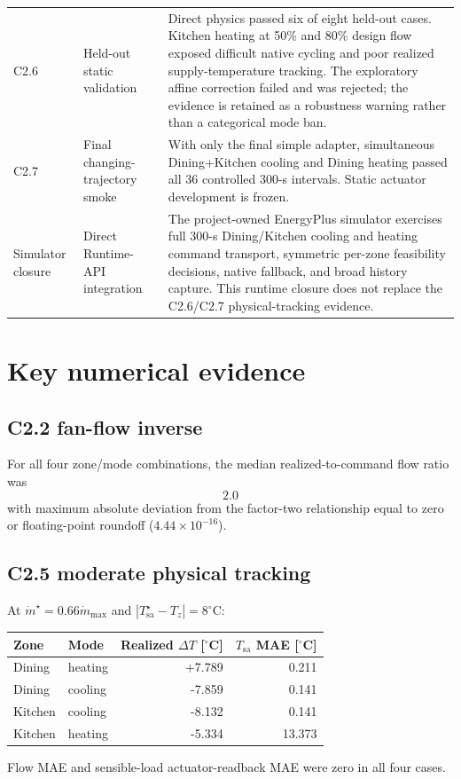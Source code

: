 \documentclass[11pt]{article}
\newcommand{\mdot}{\dot m}
\begin{document}
\begin{longtable}{p{}p{}p{}}
C2.6 &
Held-out static validation &
Direct physics passed six of eight held-out cases.  Kitchen heating at 50\%
and 80\% design flow exposed difficult native cycling and poor realized
supply-temperature tracking.  The exploratory affine correction failed and
was rejected; the evidence is retained as a robustness warning rather than a
categorical mode ban. \\

C2.7 &
Final changing-trajectory smoke &
With only the final simple adapter, simultaneous Dining+Kitchen cooling and
Dining heating passed all 36 controlled 300-s intervals.  Static actuator
development is frozen. \\

Simulator closure &
Direct Runtime-API integration &
The project-owned EnergyPlus simulator exercises full 300-s Dining/Kitchen
cooling and heating command transport, symmetric per-zone feasibility
decisions, native fallback, and broad history capture.  This runtime closure
does not replace the C2.6/C2.7 physical-tracking evidence. \\
\bottomrule
\end{longtable}

\section{Key numerical evidence}

\subsection{C2.2 fan-flow inverse}

For all four zone/mode combinations, the median realized-to-command flow ratio
was
\begin{equation}
\boxed{2.0}
\end{equation}
with maximum absolute deviation from the factor-two relationship equal to zero
or floating-point roundoff ($4.44\times10^{-16}$).

\subsection{C2.5 moderate physical tracking}

At $\mdot^\star=0.66\mdot_{\max}$ and
$|T_{\mathrm{sa}}^\star-T_z|=8^\circ$C:
\begin{center}
\begin{tabular}{llrr}
\toprule
Zone & Mode & Realized $\Delta T$ [$^\circ$C] & $T_{\mathrm{sa}}$ MAE [$^\circ$C] \\
\midrule
Dining & heating & +7.789 & 0.211 \\
Dining & cooling & -7.859 & 0.141 \\
Kitchen & cooling & -8.132 & 0.141 \\
Kitchen & heating & -5.334 & 13.373 \\
\bottomrule
\end{tabular}
\end{center}
Flow MAE and sensible-load actuator-readback MAE were zero in all four cases.
\end{document}
